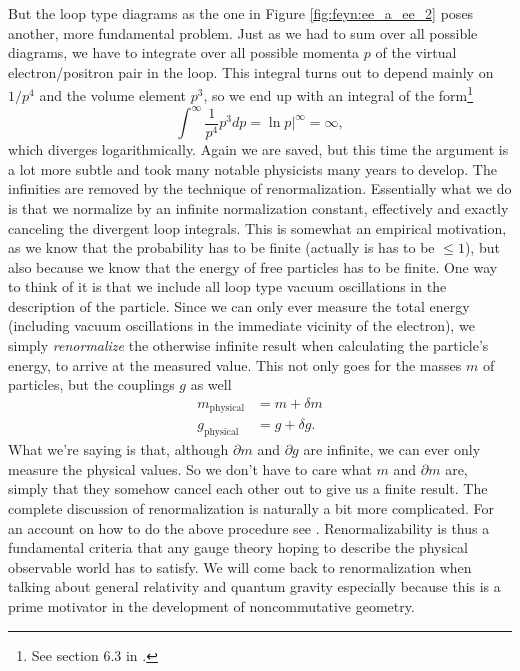 But the loop type diagrams as the one in Figure \ref{fig:feyn:ee_a_ee_2} poses another, more fundamental problem. Just as we had to sum over all possible diagrams, we have to integrate over all possible momenta $p$ of the virtual electron/positron pair in the loop. This integral turns out to depend mainly on $1 / p^4$ and the volume element $p^3$, so we end up with an integral of the form\footnote{See section 6.3 in \cite{griffiths1987iep}.}
\begin{equation}
	\int^\infty \frac{1}{p^4}p^3 dp = \ln{p}|^\infty = \infty,
\end{equation}
which diverges logarithmically. Again we are saved, but this time the argument is a lot more subtle and took many notable physicists many years to develop. The infinities are removed by the technique of renormalization. Essentially what we do is that we normalize by an infinite normalization constant, effectively and exactly canceling the divergent loop integrals. This is somewhat an empirical motivation, as we know that the probability has to be finite (actually is has to be $\leq 1$), but also because we know that the energy of free particles has to be finite. One way to think of it is that we include all loop type vacuum oscillations in the description of the particle. Since we can only ever measure the total energy (including vacuum oscillations in the immediate vicinity of the electron), we simply \emph{renormalize} the otherwise infinite result when calculating the particle's energy, to arrive at the measured value. This not only goes for the masses $m$ of particles, but the couplings $g$ as well \cite{griffiths1987iep}
\begin{align}
	m_{\textrm{physical}} &= m + \delta m \nonumber \\
	g_{\textrm{physical}} &= g + \delta g.
\end{align}
What we're saying is that, although $\partial m$ and $\partial g$ are infinite, we can ever only measure the physical values. So we don't have to care what $m$ and $\partial m$ are, simply that they somehow cancel each other out to give us a finite result. The complete discussion of renormalization is naturally a bit more complicated. For an account on how to do the above procedure see \cite{sakurai1967aqm}. Renormalizability is thus a fundamental criteria that any gauge theory hoping to describe the physical observable world has to satisfy. We will come back to renormalization when talking about general relativity and quantum gravity especially because this is a prime motivator in the development of noncommutative geometry.
